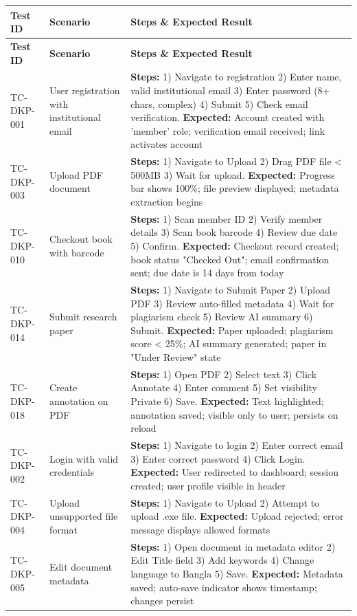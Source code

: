 \documentclass[12pt,a4paper]{report}
\begin{document}
\begin{longtable}{|p{2cm}|p{3cm}|p{8.5cm}|}
\hline
\textbf{Test ID} & \textbf{Scenario} & \textbf{Steps \& Expected Result} \\ \hline
\endfirsthead
\hline
\textbf{Test ID} & \textbf{Scenario} & \textbf{Steps \& Expected Result} \\ \hline
\endhead
TC-DKP-001 & User registration with institutional email & \textbf{Steps:} 1) Navigate to registration 2) Enter name, valid institutional email 3) Enter password (8+ chars, complex) 4) Submit 5) Check email verification. \textbf{Expected:} Account created with 'member' role; verification email received; link activates account \\ \hline
TC-DKP-003 & Upload PDF document & \textbf{Steps:} 1) Navigate to Upload 2) Drag PDF file < 500MB 3) Wait for upload. \textbf{Expected:} Progress bar shows 100\%; file preview displayed; metadata extraction begins \\ \hline
TC-DKP-010 & Checkout book with barcode & \textbf{Steps:} 1) Scan member ID 2) Verify member details 3) Scan book barcode 4) Review due date 5) Confirm. \textbf{Expected:} Checkout record created; book status "Checked Out"; email confirmation sent; due date is 14 days from today \\ \hline
TC-DKP-014 & Submit research paper & \textbf{Steps:} 1) Navigate to Submit Paper 2) Upload PDF 3) Review auto-filled metadata 4) Wait for plagiarism check 5) Review AI summary 6) Submit. \textbf{Expected:} Paper uploaded; plagiarism score < 25\%; AI summary generated; paper in "Under Review" state \\ \hline
TC-DKP-018 & Create annotation on PDF & \textbf{Steps:} 1) Open PDF 2) Select text 3) Click Annotate 4) Enter comment 5) Set visibility Private 6) Save. \textbf{Expected:} Text highlighted; annotation saved; visible only to user; persists on reload \\ \hline
TC-DKP-002 & Login with valid credentials & \textbf{Steps:} 1) Navigate to login 2) Enter correct email 3) Enter correct password 4) Click Login. \textbf{Expected:} User redirected to dashboard; session created; user profile visible in header \\ \hline
TC-DKP-004 & Upload unsupported file format & \textbf{Steps:} 1) Navigate to Upload 2) Attempt to upload .exe file. \textbf{Expected:} Upload rejected; error message displays allowed formats \\ \hline
TC-DKP-005 & Edit document metadata & \textbf{Steps:} 1) Open document in metadata editor 2) Edit Title field 3) Add keywords 4) Change language to Bangla 5) Save. \textbf{Expected:} Metadata saved; auto-save indicator shows timestamp; changes persist \\ \hline

\end{longtable}
\end{document}
